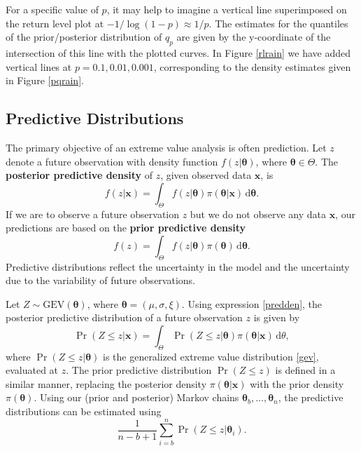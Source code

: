 \documentclass[11pt,a4paper]{article}
\newcommand{\bs}{\boldsymbol}
\begin{document}
For a specific value of $p$, it may help to imagine a vertical line superimposed on the return level plot at $-1/\log(1-p) \approx 1/p$.
The estimates for the quantiles of the prior/posterior distribution of $q_p$ are given by the y-coordinate of the intersection of this line with the plotted curves.
In Figure \ref{rlrain} we have added vertical lines at $p = 0.1,0.01,0.001$, corresponding to the density estimates given in Figure \ref{pqrain}.

\subsection{Predictive Distributions}
\label{predictive}

The primary objective of an extreme value analysis is often prediction.
Let $z$ denote a future observation with density function $f(z|\bs{\theta})$, where $\bs{\theta} \in \Theta$.
The \textbf{posterior predictive density} of $z$, given observed data $\bs{x}$, is
\begin{equation}
f(z|\bs{x}) = \int_\Theta f(z|\bs{\theta})\pi(\bs{\theta}|\bs{x}) \, \text{d}\bs{\theta}.
\label{predden}
\end{equation}
If we are to observe a future observation $z$ but we do not observe any data $\bs{x}$, our predictions are based on the \textbf{prior predictive density}
\begin{equation*}
f(z) = \int_\Theta f(z|\bs{\theta})\pi(\bs{\theta}) \, \text{d}\bs{\theta}.
\end{equation*}
Predictive distributions reflect the uncertainty in the model and the uncertainty due to the variability of future observations.

Let $Z \sim \text{GEV}(\bs{\theta})$, where $\bs{\theta} = (\mu,\sigma,\xi)$.
Using expression \eqref{predden}, the posterior predictive distribution of a future observation $z$ is given by
\begin{equation*}
\Pr(Z \leq z | \bs{x}) = \int_\Theta \Pr(Z \leq z | \bs{\theta})\pi(\bs{\theta}|\bs{x}) \, \text{d}\theta,
\end{equation*}
where $\Pr(Z \leq z | \bs{\theta})$ is the generalized extreme value distribution \eqref{gev}, evaluated at $z$.
The prior predictive distribution $\Pr(Z \leq z)$ is defined in a similar manner, replacing the posterior density $\pi(\bs{\theta}|\bs{x})$ with the prior density $\pi(\bs{\theta})$.
Using our (prior and posterior) Markov chains $\bs{\theta}_b,\dots,\bs{\theta}_n$, the predictive distributions can be estimated using
\begin{equation}
\frac{1}{n-b+1} \sum_{i=b}^{n} \Pr(Z \leq z | \bs{\theta}_i).
\label{predest}
\end{equation}
\end{document}
